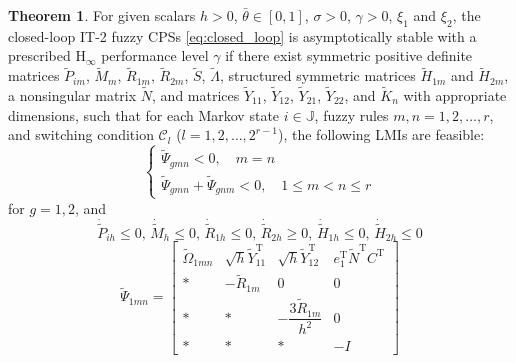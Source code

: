 \documentclass[preprint,review,fleqn,sort&compress,3p]{elsarticle}
\theoremstyle{definition} %
\theoremstyle{definition}%
\newtheorem{thm}{Theorem}[section]
\begin{document}
\begin{thm}\label{thm2}
 For given scalars $h > 0$, $\bar{\theta} \in [0,1]$, $\sigma > 0$, $\gamma > 0$, $\xi_1$ and $\xi_2$, the closed-loop IT-2 fuzzy CPSs \eqref{eq:closed_loop} is asymptotically stable with a prescribed $\mathrm{H}_\infty$ performance level $\gamma$ if there exist symmetric positive definite matrices $\tilde{P}_{im}$, $\tilde{M}_{m}$, $\tilde{R}_{1m}$, $\tilde{R}_{2m}$, $\tilde{S}$, $\tilde{\Lambda}$, structured symmetric matrices $\tilde{H}_{1m}$ and $\tilde{H}_{2m}$, a nonsingular matrix $\tilde{N}$, and matrices $\tilde{Y}_{11}$, $\tilde{Y}_{12}$, $\tilde{Y}_{21}$, $\tilde{Y}_{22}$, and $\widetilde{K}_n$ with appropriate dimensions, such that for each Markov state $i \in \mathbb{J}$, fuzzy rules $m,n = 1,2,\ldots,r$, and switching condition $\mathcal{C}_l$ ($l = 1,2,\ldots,2^{r-1}$), the following LMIs are feasible:
	\begin{equation}\label{shucr1_not}
		\begin{cases}
			\widetilde{\Psi}_{gmn} < 0 	,\quad  m=n  \\
			\widetilde{\Psi}_{gmn} + \widetilde{\Psi}_{gnm} < 0,\quad 1 \le m 	< n \le r
		\end{cases}
	\end{equation}
	for $g=1,2$, and
	\begin{equation}\label{dot_hat_small_0}
	\dot{\widetilde{P}}_{ih} \leq 0, \, 
	\dot{\widetilde{M}}_{h} \leq 0, \, 
	\dot{\widetilde{R}}_{1h} \leq 0, \, 
	\dot{\widetilde{R}}_{2h} \geq 0, \, 
	\dot{\widetilde{H}}_{1h} \leq 0, \, 
	\dot{\widetilde{H}}_{2h} \leq 0
	\end{equation}
\begin{equation}\label{LMI1_not}
\widetilde{\Psi}_{1mn} =
\begin{bmatrix}
	\widetilde{\Omega}_{1mn} & \sqrt{h} \widetilde{Y}_{11}^{\mathrm{T}} & \sqrt{h} \widetilde{Y}_{12}^{\mathrm{T}} & e_1^{\mathrm{T}} \widetilde{N}^{\mathrm{T}} {C}^{\mathrm{T}}\\[1.5ex]
	* & -\widetilde{R}_{1m} & 0 & 0 \\[1.5ex]
	* & * & -\dfrac{3\widetilde{R}_{1m}}{h^2} & 0\\[1.5ex]
	* & * & * & -I
\end{bmatrix}
\end{equation}


\end{thm}
\end{document}

